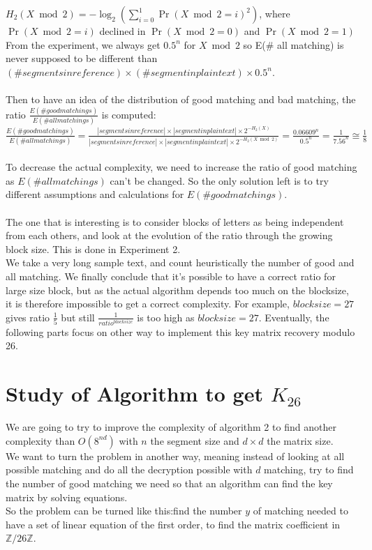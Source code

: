 \documentclass{article}
\begin{document}
$H_{2}(X \bmod 2) = -\log_2(\sum_{i=0}^{1}{\Pr(X \bmod 2 =i)^2})$, where $\Pr(X \bmod 2=i)$ declined in $\Pr(X \bmod 2=0)$ and $\Pr(X \bmod 2 =1)$\\
From the experiment, we always get $0.5^n$ for $X \bmod 2$ so E(\# all matching) is never supposed to be different than $(\# segments in reference) \times (\#segment in plaintext) \times 0.5^n$.\\
\\
Then to have an idea of the distribution of good matching and bad matching, the ratio $\frac{E(\# good matchings)}{E(\# all matchings)}$ is computed: $\frac{E(\# good matchings)}{E(\# all matchings)} = \frac{|segments in reference| \times |segment in plaintext| \times 2^{-H_{2}(X)}}{|segments in reference| \times |segment in plaintext| \times 2^{-H_{2}(X \bmod 2)}}  = \frac{0.06609^n}{0.5^n} = \frac{1}{7.56^n} \cong \frac{1}{8} $\\
\\
To decrease the actual complexity, we need to increase the ratio of good matching as $E(\# all matchings)$ can't be changed. So the only solution left is to try different assumptions and calculations for $E(\# good matchings)$.\\
\\
The one that is interesting is to consider blocks of letters as being independent from each others, and look at the evolution of the ratio through the growing block size. This is done in Experiment 2.\\
We take a very long sample text, and count heuristically the number of good and all matching. 
We finally conclude that it's possible to have a correct ratio for large size block, but as the actual algorithm depends too much on the blocksize, it is therefore impossible to get a correct complexity. For example, $blocksize=27$ gives ratio $\frac{1}{5}$ but still $\frac{1}{ratio^{blocksize}}$ is too high as $blocksize = 27$.
Eventually, the following parts focus on other way to implement this key matrix recovery modulo 26.\\

\section{Study of Algorithm to get $K_{26}$}
We are going to try to improve the complexity of algorithm 2 to find another complexity than $O(8^{nd})$ with $n$ the segment size and $d \times d$ the matrix size.\\
We want to turn the problem in another way, meaning instead of looking at all possible matching and do all the decryption possible with $d$ matching, try to find  the number of good matching we need so that an algorithm can find the key matrix by solving equations.\\
So the problem can be turned like this:find the number $y$ of matching needed to have a set of linear equation of the first order, to find the matrix coefficient in $\mathbb{Z}/26\mathbb{Z}$.\\
\end{document}
